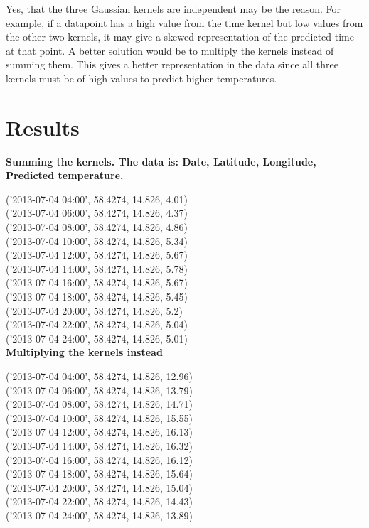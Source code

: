 \documentclass[a4paper,titlepage,12pt]{article}
\begin{document}
Yes, that the three Gaussian kernels are independent may be the reason. For
example, if a datapoint has a high value from the time kernel but low values
from the other two kernels, it may give a skewed representation of the predicted
time at that point. A better solution would be to multiply the kernels instead
of summing them. This gives a better representation in the data since all three
kernels must be of high values to predict higher temperatures. 

\section{Results}

\textbf{Summing the kernels. The data is: Date, Latitude, Longitude, Predicted temperature.}

('2013-07-04 04:00', 58.4274, 14.826, 4.01) \\
('2013-07-04 06:00', 58.4274, 14.826, 4.37) \\
('2013-07-04 08:00', 58.4274, 14.826, 4.86) \\
('2013-07-04 10:00', 58.4274, 14.826, 5.34) \\
('2013-07-04 12:00', 58.4274, 14.826, 5.67) \\
('2013-07-04 14:00', 58.4274, 14.826, 5.78) \\
('2013-07-04 16:00', 58.4274, 14.826, 5.67) \\
('2013-07-04 18:00', 58.4274, 14.826, 5.45) \\
('2013-07-04 20:00', 58.4274, 14.826, 5.2) \\
('2013-07-04 22:00', 58.4274, 14.826, 5.04) \\
('2013-07-04 24:00', 58.4274, 14.826, 5.01) \\

\textbf{Multiplying the kernels instead}

('2013-07-04 04:00', 58.4274, 14.826, 12.96) \\
('2013-07-04 06:00', 58.4274, 14.826, 13.79) \\
('2013-07-04 08:00', 58.4274, 14.826, 14.71) \\
('2013-07-04 10:00', 58.4274, 14.826, 15.55) \\
('2013-07-04 12:00', 58.4274, 14.826, 16.13) \\
('2013-07-04 14:00', 58.4274, 14.826, 16.32) \\
('2013-07-04 16:00', 58.4274, 14.826, 16.12) \\
('2013-07-04 18:00', 58.4274, 14.826, 15.64) \\
('2013-07-04 20:00', 58.4274, 14.826, 15.04) \\
('2013-07-04 22:00', 58.4274, 14.826, 14.43) \\
('2013-07-04 24:00', 58.4274, 14.826, 13.89) \\
\end{document}
